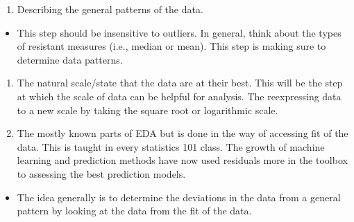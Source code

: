 \documentclass[print]{nuthesis}
\providecommand{\tightlist}{%
  \setlength{\itemsep}{0pt}\setlength{\parskip}{0pt}}
\begin{document}
\begin{enumerate}
\def\labelenumi{\arabic{enumi}.}
\setcounter{enumi}{1}
\tightlist
\item
  Describing the general patterns of the data.
\end{enumerate}

\begin{itemize}
\tightlist
\item
  This step should be insensitive to outliers.
  In general, think about the types of resistant measures (i.e., median or mean).
  This step is making sure to determine data patterns.
\end{itemize}

\begin{enumerate}
\def\labelenumi{\arabic{enumi}.}
\setcounter{enumi}{2}
\item
  The natural scale/state that the data are at their best.
  This will be the step at which the scale of data can be helpful for analysis.
  The reexpressing data to a new scale by taking the square root or logarithmic scale.
\item
  The mostly known parts of EDA but is done in the way of accessing fit of the data.
  This is taught in every statistics 101 class.
  The growth of machine learning and prediction methods have now used residuals more in the toolbox to assessing the best prediction models.
\end{enumerate}

\begin{itemize}
\tightlist
\item
  The idea generally is to determine the deviations in the data from a general pattern by looking at the data from the fit of the data.
\end{itemize}

\end{document}

